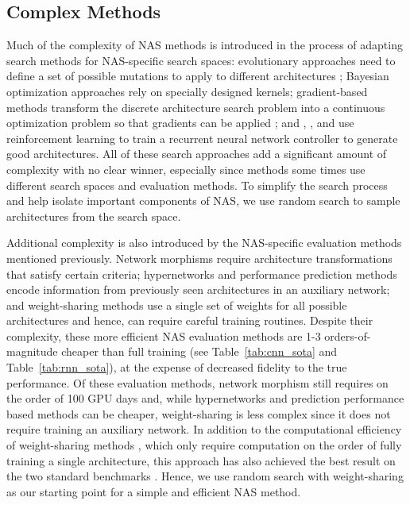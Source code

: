 \documentclass[acmlarge, nonacm]{acmart}
\begin{document}
\subsection{Complex Methods}
\label{ssec:complex}
Much of the complexity of NAS methods is introduced in the process of adapting search methods for NAS-specific search spaces: evolutionary approaches need to define a set of possible mutations to apply to different architectures \citep{eshp2017,Real2018}; Bayesian optimization approaches \citep{Jin2018,Kandasamy2018} rely on specially designed kernels; gradient-based methods transform the discrete architecture search problem into a continuous optimization problem so that gradients can be applied \citep{Luo2018, liu2018darts, xie2018snas,cai2018proxylessnas}; and \citet{nasRL}, \citet{Zoph2018LearningTA}, and \citet{pham18ENAS} use reinforcement learning to train a recurrent neural network controller to generate good architectures.  All of these search approaches add a significant amount of complexity with no clear winner, especially since methods some times use different search spaces and evaluation methods.  To simplify the search process and help isolate important components of NAS, we use random search to sample architectures from the search space.

Additional complexity is also introduced by the NAS-specific evaluation methods mentioned previously.
Network morphisms require architecture transformations that satisfy certain criteria; hypernetworks and performance prediction methods encode information from previously seen architectures in an auxiliary network; and weight-sharing methods \citep{pham18ENAS, liu2018darts, bender2018understanding,xie2018snas,cai2018proxylessnas} use a single set of weights for all possible architectures and hence, can require careful training routines.  
Despite their complexity, these more efficient NAS evaluation methods are 1-3 orders-of-magnitude cheaper than full training (see Table~\ref{tab:cnn_sota} and Table~\ref{tab:rnn_sota}),  at the expense of decreased fidelity to the true performance.  
Of these evaluation methods, network morphism still requires on the order of 100 GPU days \citep{pnas2018,Elsken2018pareto} and, while hypernetworks and prediction performance based methods can be cheaper, weight-sharing is less complex since it does not require training an auxiliary network.   In addition to the computational efficiency of weight-sharing methods \citep{liu2018darts, pham18ENAS, cai2018proxylessnas, xie2018snas}, which only require computation on the order of fully training a single architecture, this approach  has also achieved the best result on the two standard benchmarks \citep{liu2018darts,cai2018proxylessnas}.  Hence, we use random search with weight-sharing as our starting point for a simple and efficient NAS method.
\end{document}
